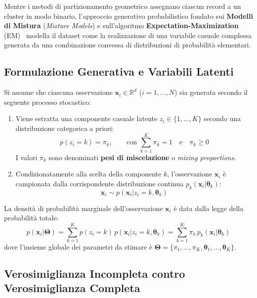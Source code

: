 Mentre i metodi di partizionamento geometrico assegnano ciascun record a un cluster in modo binario, l'approccio generativo probabilistico fondato sui \textbf{Modelli di Mistura} (\textit{Mixture Models}) e sull'algoritmo \textbf{Expectation-Maximization} (EM)~\cite{dempster1977} modella il dataset come la realizzazione di una variabile casuale complessa generata da una combinazione convessa di distribuzioni di probabilità elementari.

\subsection{Formulazione Generativa e Variabili Latenti}

Si assume che ciascuna osservazione $\mathbf{x}_i \in \mathbb{R}^d$ ($i = 1, \dots, N$) sia generata secondo il seguente processo stocastico:
\begin{enumerate}
    \item Viene estratta una componente casuale latente $z_i \in \{1, \dots, K\}$ secondo una distribuzione categorica a priori:
    \begin{equation}
    p(z_i = k) = \pi_k, \qquad \text{con } \sum_{k=1}^K \pi_k = 1 \quad \text{e} \quad \pi_k \ge 0
    \end{equation}
    I valori $\pi_k$ sono denominati \textbf{pesi di miscelazione} o \textit{mixing proportions}.
    \item Condizionatamente alla scelta della componente $k$, l'osservazione $\mathbf{x}_i$ è campionata dalla corrispondente distribuzione continua $p_k(\mathbf{x}_i | \boldsymbol{\theta}_k)$:
    \begin{equation}
    \mathbf{x}_i \sim p(\mathbf{x}_i | z_i = k, \boldsymbol{\theta}_k)
    \end{equation}
\end{enumerate}
La densità di probabilità marginale dell'osservazione $\mathbf{x}_i$ è data dalla legge della probabilità totale:
\begin{equation}
\label{eq:dm-mixture-marginal-density}
p(\mathbf{x}_i | \boldsymbol{\Theta}) = \sum_{k=1}^K p(z_i = k) \, p(\mathbf{x}_i | z_i = k, \boldsymbol{\theta}_k) = \sum_{k=1}^K \pi_k \, p_k(\mathbf{x}_i | \boldsymbol{\theta}_k)
\end{equation}
dove l'insieme globale dei parametri da stimare è $\boldsymbol{\Theta} = \{\pi_1, \dots, \pi_K, \boldsymbol{\theta}_1, \dots, \boldsymbol{\theta}_K\}$.

\subsection{Verosimiglianza Incompleta contro Verosimiglianza Completa}

